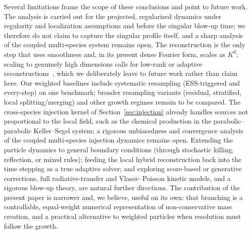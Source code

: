 \documentclass[a4paper,fleqn]{cas-sc}
\theoremstyle{definition}
\theoremstyle{remark}
\begin{document}
Several limitations frame the scope of these conclusions and point to future work. The analysis is carried out
for the projected, regularized dynamics under regularity and localization assumptions and before the singular
blow-up time; we therefore do not claim to capture the singular profile itself, and a sharp analysis of the
coupled multi-species system remains open. The reconstruction is the only step that uses smoothness and, in its
present dense Fourier form, scales as $K^d$; scaling to genuinely high dimensions calls for low-rank or adaptive
reconstructions~\cite{TangYing2025FHT,tang2025solving,Peng_Yang_tensor_arxiv_2024,novikov2021tensor,sheng2025approximation},
which we deliberately leave to future work rather than claim here. Our weighted baselines include systematic
resampling (ESS-triggered and every-step) on one benchmark; broader resampling variants (residual, stratified,
local splitting/merging) and other growth regimes remain to be compared. The cross-species injection kernel of
Section~\ref{sec:injection} already handles sources not proportional to the local field, such as the chemical
production in the parabolic--parabolic Keller--Segel system; a rigorous unbiasedness and convergence analysis of
the coupled multi-species injection dynamics remains open. Extending the particle dynamics to general
boundary conditions (through stochastic killing, reflection, or mixed rules); feeding the local
hybrid reconstruction back into the time stepping as a true adaptive solver; and exploring
score-based or generative corrections, full radiative-transfer and Vlasov--Poisson kinetic models, and a rigorous
blow-up theory, are natural further directions. The contribution of the present paper is narrower and, we believe,
useful on its own: that branching is a controllable, equal-weight numerical representation of non-conservative
mass creation, and a practical alternative to weighted particles when resolution must follow the growth.


\end{document}
